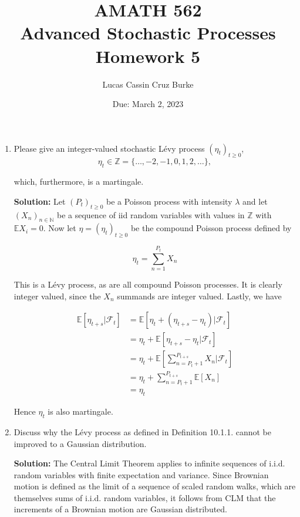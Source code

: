 \documentclass[12pt, a4paper]{article}
\begin{document}
\title{{AMATH 562\\
Advanced Stochastic Processes}\\
{\bf \Huge Homework 5}}

\author{Lucas Cassin Cruz Burke}

\date{Due: March 2, 2023}

\maketitle

    \begin{enumerate}
        \item Please give an integer-valued stochastic Lévy process $(\eta_t)_{t\ge 0}$, $$\eta_t \in \mathbb Z = \{ \dots, -2, -1, 0, 1, 2, \dots \},$$
        
        which, furthermore, is a martingale.

        \textbf{Solution:} Let $(P_t)_{t\ge 0}$ be a Poisson process with intensity $\lambda$ and let $(X_n)_{n\in \mathbb N}$ be a sequence of iid random variables with values in $\mathbb Z$ with $\mathbb E X_i =0$. Now let $\eta = (\eta_t)_{t \ge 0}$ be the compound Poisson process defined by 

        $$\eta_t = \sum_{n=1}^{P_t} X_n$$

        This is a Lévy process, as are all compound Poisson processes. It is clearly integer valued, since the $X_n$ summands are integer valued. Lastly, we have

        \begin{align*}
            \mathbb E[\eta_{t+s} | \mathcal F_t] &= \mathbb E[\eta_t +(\eta_{t+s}-\eta_t)|\mathcal F_t] \\
            &= \eta_t + \mathbb E[\eta_{t+s} - \eta_t|\mathcal F_t] \\
            &= \eta_t + \mathbb E \left[\sum_{n=P_t + 1}^{P_{t+s}} X_n \Big| \mathcal F_t \right]\\
            &= \eta_t + \sum_{n=P_t + 1}^{P_{t+s}} \mathbb E[X_n]\\
            &= \eta_t
        \end{align*}

        Hence $\eta_t$ is also martingale. 

        \item Discuss why the Lévy process as defined in Definition 10.1.1. cannot be improved to a Gaussian distribution.
        
        \textbf{Solution:} The Central Limit Theorem applies to infinite sequences of i.i.d. random variables with finite expectation and variance. Since Brownian motion is defined as the limit of a sequence of scaled random walks, which are themselves sums of i.i.d. random variables, it follows from CLM that the increments of a Brownian motion are Gaussian distributed. 


\end{enumerate}
\end{document}
